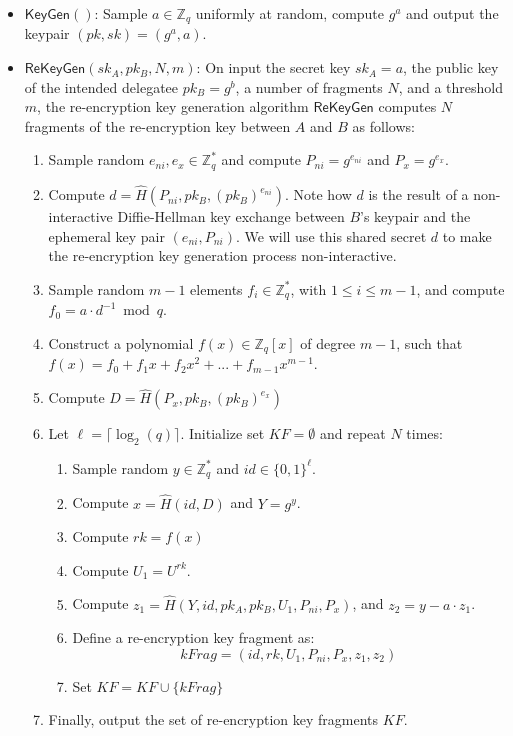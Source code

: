 \documentclass{amsart}
\renewcommand{\P}[1]{P_{#1}}
\begin{document}
\begin{itemize}
	\item $\mathsf{KeyGen}()$: Sample $a \in \mathbb Z_q$ uniformly at random, compute $g^a$ and output the keypair $(pk, sk) = (g^a, a)$.

	\item $\mathsf{ReKeyGen}(sk_A, pk_B, N, m)$: On input the secret key $sk_{A} = a$, the public key of the intended delegatee $pk_{B} = g^b$, a number of fragments $N$, and a threshold $m$, the re-encryption key generation algorithm $\mathsf{ReKeyGen}$ computes $N$ fragments of the re-encryption key between $A$ and $B$ as follows:
	
	\begin{enumerate}
\item Sample random $e_{ni}, e_x \in \mathbb Z^*_q$ and compute $\P{ni} = g^{e_{ni}}$ and $\P{x} = g^{e_x}$.
\item Compute $d = \hat H(\P{ni}, pk_B, (pk_B)^{e_{ni}})$. Note how $d$ is the result of a non-interactive Diffie-Hellman key exchange between $B$'s keypair and the ephemeral key pair $(e_{ni},\P{ni})$. We will use this shared secret $d$ to make the re-encryption key generation process non-interactive.
\item Sample random $m-1$ elements $f_i\in \mathbb Z_q^*$, with $1 \leq i \leq m-1$, and  compute $f_0 = a \cdot d^{-1} \bmod q$.
\item Construct a polynomial $f(x) \in \mathbb Z_q[x]$ of degree $m-1$, such that $f(x) = f_0 + f_1x + f_2x^2 + ... + f_{m-1}x^{m-1}$.  
\item Compute $D = \hat H(\P x, pk_B, (pk_B)^{e_x})$
\item Let $\ell = \lceil\log_2(q)\rceil$. Initialize set $KF = \emptyset$ and repeat $N$ times:

    \begin{enumerate}
    \item Sample random $y \in \mathbb Z_q^*$ and $id \in \{0,1\}^\ell$.
    \item Compute $x = \hat H(id, D)$ and $Y = g^y$.
    \item Compute $rk = f(x)$ 
    \item Compute $U_1 = U^{rk}$.
    \item Compute $z_1 = \hat H(Y, id, pk_A, pk_B, U_1, \P{ni}, \P x)$, and $z_2 = y - a \cdot z_1$.
    \item Define a re-encryption key fragment as: $$kFrag = (id, rk, U_1, \P{ni}, \P x, z_1, z_2)$$
    \item Set $KF = KF \cup \{kFrag\}$
	\end{enumerate}

\item Finally, output the set of re-encryption key fragments $KF$.
\end{enumerate}
\end{itemize}
\end{document}
